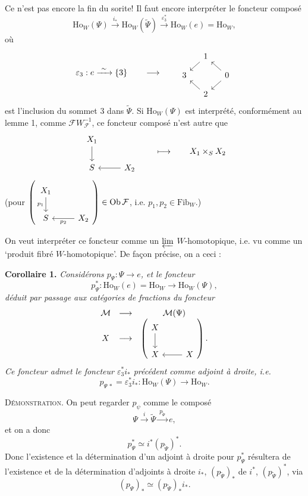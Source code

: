 \documentclass[11pt]{article}
\newcommand{\printedpage}[1]{\marginpar{\footnotesize p.~#1}}
\newcommand{\msp}[1]{\marginpar{\footnotesize [#1]}}
\newcommand{\Ho}{\mathrm{Ho}}
\newcommand{\Fib}{\mathrm{Fib}}
\begin{document}
Ce n'est pas encore la fin du sorite! Il faut encore interpréter le foncteur composé
\[
\Ho_W(\Psi)\xrightarrow{\ i_*\ }\Ho_W(\tilde{\Psi})\xrightarrow{\ \varepsilon_3^*\ }\Ho_W(e)=\Ho_W,
\]
où
\[
\varepsilon_3 : e\xrightarrow{\ \sim\ }\{3\}
\qquad\longrightarrow\qquad
\begin{tikzcd}[ampersand replacement=\&, column sep=small, row sep=small]
\& 1 \arrow[dl] \& \\
3 \& \& 0 \arrow[ul] \arrow[dl] \\
\& 2 \arrow[ul] \&
\end{tikzcd}
\]
est l'inclusion du sommet 3 dans $\tilde{\Psi}$. Si $\Ho_W(\Psi)$ est interprété, conformément au lemme 1, comme $\mathcal{F}W_{\mathcal{F}}^{-1}$, ce foncteur composé n'est autre que
\[
\begin{tikzcd}[ampersand replacement=\&]
X_1 \arrow[d] \& \\
S \& X_2 \arrow[l]
\end{tikzcd}
\qquad\longmapsto\qquad X_1\times_S X_2
\]
\printedpage{166}
(pour $\left(\begin{tikzcd}[ampersand replacement=\&] X_1 \arrow[d, "p_1"'] \& \\ S \& X_2 \arrow[l, "p_2"] \end{tikzcd}\right)\in \mathrm{Ob}\,\mathcal{F}$, i.e. $p_1,p_2\in\Fib_W$.)

On veut interpréter ce foncteur comme un $\varprojlim$ $W$-homotopique, i.e. vu comme un `produit fibré $W$-homotopique'. De façon précise, on a ceci :

\msp{page 256}
\textbf{Corollaire 1.} \textit{Considérons $p_\Psi : \Psi\longrightarrow e$, et le foncteur}
\[
p_\Psi^* : \Ho_W(e)=\Ho_W\longrightarrow\Ho_W(\Psi),
\]
\textit{déduit par passage aux catégories de fractions du foncteur}
\[
\begin{array}{ccc}
\mathcal{M} & \longrightarrow & \mathcal{M}(\Psi) \\
X & \longrightarrow & \left(
\begin{tikzcd}[ampersand replacement=\&]
X \arrow[d] \& \\
X \& X \arrow[l]
\end{tikzcd}
\right).
\end{array}
\]
\textit{Ce foncteur admet le foncteur $\varepsilon_3^*i_*$ précédent comme adjoint à droite, i.e.}
\[
p_{\Psi\,*}=\varepsilon_3^*i_* : \Ho_W(\Psi)\longrightarrow\Ho_W.
\]

\textsc{Démonstration}. On peut regarder $p_\psi$ comme le composé %
\[
\Psi\xrightarrow{\ i\ }\tilde{\Psi}\xrightarrow{\ p_{\tilde{\Psi}}\ }e,
\]
et on a donc
\[
p_\Psi^*\simeq i^*(p_{\tilde{\Psi}})^*.
\]
Donc l'existence et la détermination d'un adjoint à droite pour $p_\Psi^*$ résultera de l'existence et de la détermination d'adjoints à droite $i_*$, $(p_{\tilde{\Psi}})_*$ de $i^*$, $(p_{\tilde{\Psi}})^*$, via
\[
(p_\Psi)_*\simeq(p_{\tilde{\Psi}})_*i_*.
\]
\end{document}

